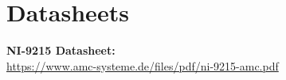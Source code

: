 \documentclass{article}
\begin{document}
\newpage
\begin{appendices}
\pagestyle{fancy}
\renewcommand{\thefigure}{A\arabic{figure}}
\setcounter{figure}{0}



\pagebreak

\hypertarget{datasheets}{}
\section{Datasheets}
\begin{enumerate}[label = {[\arabic*]}]
\item \textbf{NI-9215 Datasheet:}\\[2pt] \url{https://www.amc-systeme.de/files/pdf/ni-9215-amc.pdf}


\end{enumerate}

\end{appendices}
\end{document}
